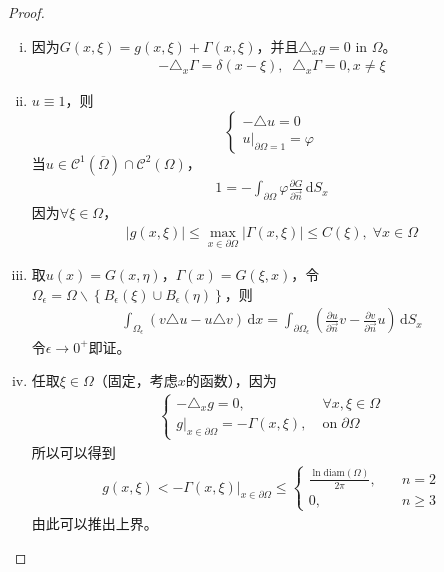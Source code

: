\documentclass[11pt, a4paper]{article}
\theoremstyle{theorem}
\newcommand{\intd}[1]{\,\mathrm{d}{#1}}
\begin{document}
\begin{proof}
\begin{enumerate}[(i)]
    \item 因为$G(x,\xi) = g(x,\xi) + \Gamma(x,\xi)$，并且$\triangle_x g = 0$ in $\Omega$。
    \begin{align*}
        - \triangle_x \Gamma = \delta(x - \xi), \;\; \triangle_x \Gamma = 0, x \neq \xi
    \end{align*}
    \item $u \equiv 1$，则
    $$
    \begin{cases}
        - \triangle u = 0 \\
        u \bigg|_{\partial \Omega=1} = \varphi
    \end{cases}
    $$
    当$u \in \mathcal{C}^1(\overline{\Omega}) \cap \mathcal{C}^2(\Omega)$，
    \begin{align*}
        1 = - \int_{\partial \Omega} \varphi \frac{\partial G}{\partial \vec{n}} \intd S_x
    \end{align*}
    因为$\forall \xi \in \Omega$，
    \begin{align}
        |g(x,\xi)| \leq \max\limits_{x \in \partial \Omega} |\Gamma(x,\xi)| \leq C(\xi), \; \forall x \in \Omega
    \end{align}
    \item 取$u(x) = G(x,\eta)$，$\Gamma(x) = G(\xi,x)$，令$\Omega_\epsilon = \Omega \backslash \left\{B_\epsilon(\xi) \cup B_\epsilon(\eta)\right\}$，则
    \begin{align}
        \int_{\Omega_\epsilon} ( v \triangle u - u \triangle v) \intd x = \int_{\partial \Omega_\epsilon} \left(\frac{\partial u}{\partial \vec{n}} v - \frac{\partial v}{\partial \vec{n}} u\right) \intd S_x
    \end{align}
    令$\epsilon \rightarrow 0^+$即证。
    \item 任取$\xi \in \Omega$（固定，考虑$x$的函数），因为
    \begin{align*}
        \begin{cases}
            - \triangle_x g = 0, \; &\forall x,\xi \in \Omega \\
            g \bigg|_{x \in \partial \Omega} = - \Gamma(x,\xi), \; &\text{on} \; \partial \Omega
        \end{cases}
    \end{align*}
    所以可以得到
    \begin{align}
        g(x,\xi) < - \Gamma(x,\xi) \bigg|_{x \in \partial \Omega} \leq
        \begin{cases}
            \frac{\ln \text{diam}(\Omega)}{2 \pi}, \quad & n = 2 \\
            0, & n \geq 3
        \end{cases}
    \end{align}
    由此可以推出上界。


\end{enumerate}
\end{proof}
\end{document}
